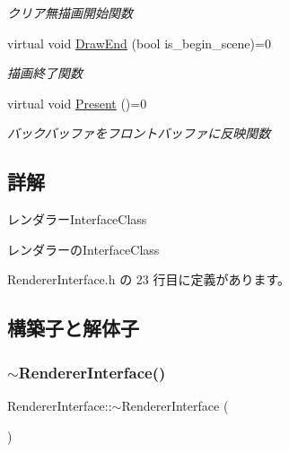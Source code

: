 \begin{DoxyCompactItemize}
\begin{DoxyCompactList}\small\item\em クリア無描画開始関数 \end{DoxyCompactList}\item 
virtual void \mbox{\hyperlink{class_renderer_interface_a0034a44420e4746062e70e4d66d3bee2}{Draw\+End}} (bool is\+\_\+begin\+\_\+scene)=0
\begin{DoxyCompactList}\small\item\em 描画終了関数 \end{DoxyCompactList}\item 
virtual void \mbox{\hyperlink{class_renderer_interface_aa9e12d2a2f5ffa351c457cfc7806b6f1}{Present}} ()=0
\begin{DoxyCompactList}\small\item\em バックバッファをフロントバッファに反映関数 \end{DoxyCompactList}\end{DoxyCompactItemize}


\subsection{詳解}
レンダラー\+Interface\+Class 

レンダラーの\+Interface\+Class 

 Renderer\+Interface.\+h の 23 行目に定義があります。



\subsection{構築子と解体子}
\mbox{\label{class_renderer_interface_a571638543a7544e023dc186f7dfc7523}} 
\subsubsection{\texorpdfstring{$\sim$\+Renderer\+Interface()}{~RendererInterface()}}
{\footnotesize\ttfamily Renderer\+Interface\+::$\sim$\+Renderer\+Interface (\begin{DoxyParamCaption}{ }\end{DoxyParamCaption})\hspace{0.3cm}{\ttfamily [pure virtual]}}




